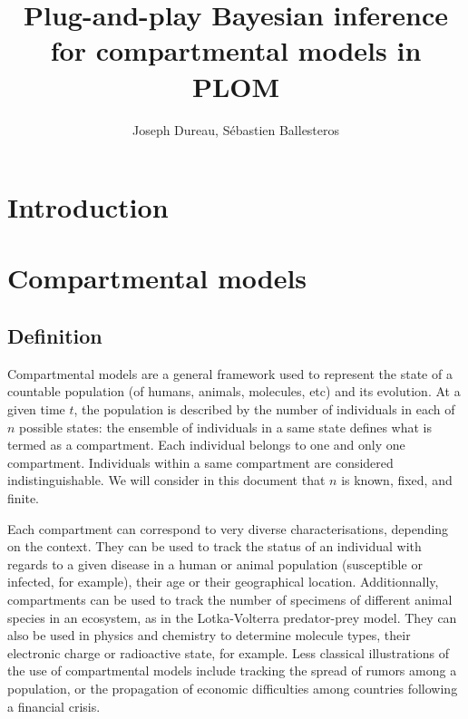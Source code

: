 \documentclass[a4paper,11pt]{article}
\begin{document}
\title{Plug-and-play Bayesian inference for compartmental models in PLOM}
\author{Joseph Dureau, S\'ebastien Ballesteros}

\maketitle

\section{Introduction}
\section{Compartmental models}
\subsection{Definition}

Compartmental models are a general framework used to represent the state of a countable population (of humans, animals, molecules, etc) and its evolution. At a given time $t$, the population is described by the number of individuals in each of $n$ possible states: the ensemble of individuals in a same state defines what is termed as a compartment. Each individual belongs to one and only one compartment. Individuals within a same compartment are considered indistinguishable. We will consider in this document that $n$ is known, fixed, and finite. 

Each compartment can correspond to very diverse characterisations, depending on the context. They can be used to track the status of an individual with regards to a given disease in a human or animal population (susceptible or infected, for example), their age or their geographical location. Additionnally, compartments can be used to track the number of specimens of different animal species in an ecosystem, as in the Lotka-Volterra predator-prey model. They can also be used in physics and chemistry to determine molecule types, their electronic charge or radioactive state, for example. Less classical illustrations of the use of compartmental models include tracking the spread of rumors among a population,  or the propagation of economic difficulties among countries following a financial crisis.
\end{document}
